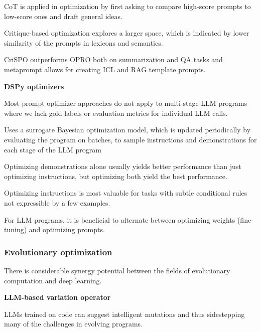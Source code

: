 CoT is applied in optimization by first asking to compare high-score prompts to low-score ones and draft general ideas. \cite{he2024crispomultiaspectcritiquesuggestionguidedautomatic}

Critique-based optimization explores a larger space, which is indicated by lower similarity of the prompts in lexicons and semantics.\cite{he2024crispomultiaspectcritiquesuggestionguidedautomatic}

CriSPO outperforms OPRO \cite{yang2024largelanguagemodelsoptimizers} both on summarization and QA tasks and metaprompt allows for creating ICL and RAG template prompts. \cite{he2024crispomultiaspectcritiquesuggestionguidedautomatic}

\textbf{DSPy optimizers}

Most prompt optimizer approaches do not apply to multi-stage LLM programs where we lack gold labels or evaluation metrics for individual LLM calls. \cite{opsahlong2024optimizinginstructionsdemonstrationsmultistage}


Uses a surrogate Bayesian optimization model, which is updated periodically by evaluating the program on batches, to sample instructions and demonstrations for each stage of the LLM program \cite{opsahlong2024optimizinginstructionsdemonstrationsmultistage}

Optimizing demonstrations alone usually yields better performance than just optimizing instructions, but optimizing both yield the best performance. \cite{opsahlong2024optimizinginstructionsdemonstrationsmultistage}

Optimizing instructions is most valuable for tasks with subtle conditional rules not expressible by a few examples.  \cite{opsahlong2024optimizinginstructionsdemonstrationsmultistage}

For LLM programs, it is beneficial to alternate between optimizing weights (fine-tuning) and optimizing prompts. \cite{soylu2024finetuningpromptoptimizationgreat}

\subsubsection{Evolutionary optimization}
There is considerable synergy potential between the fields of evolutionary computation and deep learning. \cite{lehman2022evolutionlargemodels}

\textbf{LLM-based variation operator}

LLMs trained on code can suggest intelligent mutations and thus sidestepping many of the challenges in evolving programs. \cite{lehman2022evolutionlargemodels}

